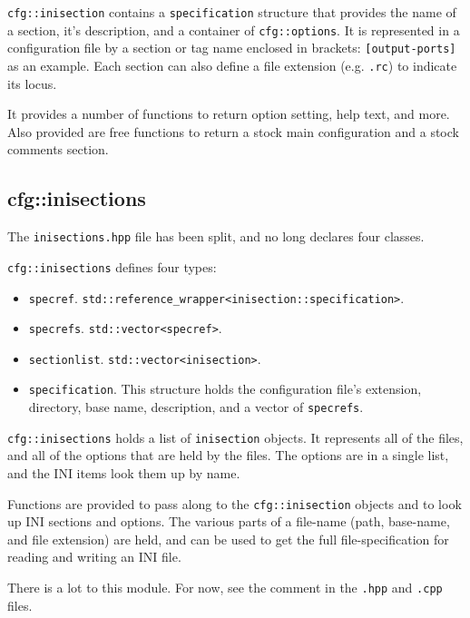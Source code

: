    \texttt{cfg::inisection}  contains a \texttt{specification} structure that
   provides the name of a section, it's description, and
   a container of \texttt{cfg::options}.
   It is represented in a configuration file by a section or tag name
   enclosed in brackets: \texttt{[output-ports]} as an example.
   Each section can also define a file extension
   (e.g. \texttt{.rc}) to indicate its locus.

   It provides a number of functions to return option setting, help text, and
   more.
   Also provided are free functions to return a stock main configuration
   and a stock comments section.

\subsection{cfg::inisections}
\label{subsec:cfg_namespace_inisections}

   The \texttt{inisections.hpp} file has been split,
   and no long declares four classes.

   \texttt{cfg::inisections} defines four types:

   \begin{itemize}
      \item \texttt{specref}.
          \texttt{std::reference\_wrapper<inisection::specification>}.
      \item \texttt{specrefs}.
          \texttt{std::vector<specref>}.
      \item \texttt{sectionlist}.
         \texttt{std::vector<inisection>}.
      \item \texttt{specification}.
         This structure holds the configuration file's extension,
         directory, base name, description, and a vector of
         \texttt{specrefs}.
   \end{itemize}

   \texttt{cfg::inisections} holds a list of \texttt{inisection} objects.
   It represents all of the files, and all of
   the options that are held by the files.
   The options are in a single list,
   and the INI items look them up by name.

   Functions are provided to pass along to the \texttt{cfg::inisection}
   objects and to look up INI sections and options.
   The various parts of a file-name (path, base-name, and file extension)
   are held, and can be used to get the full file-specification for
   reading and writing an INI file.

   There is a lot to this module.
   For now, see the comment in the \texttt{.hpp} and \texttt{.cpp} files.

